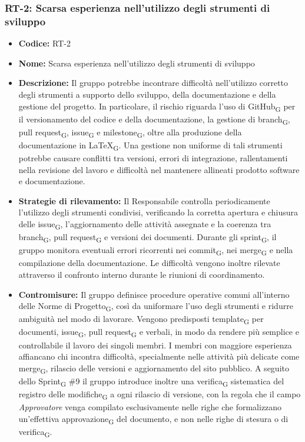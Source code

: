 ﻿\documentclass[a4paper, 10pt, colorlinks=true, linkcolor=black, urlcolor=blue, citecolor=blue, hidelinks]{article}
\begin{document}
\subsubsection{RT-2: Scarsa esperienza nell'utilizzo degli strumenti di sviluppo}

\begin{itemize}
    \item \textbf{Codice:} RT-2

    \item \textbf{Nome:} Scarsa esperienza nell'utilizzo degli strumenti di sviluppo

    \item \textbf{Descrizione:} Il gruppo potrebbe incontrare difficoltà nell'utilizzo corretto degli strumenti a supporto dello sviluppo, della documentazione e della gestione del progetto. In particolare, il rischio riguarda l'uso di GitHub\textsubscript{G} per il versionamento del codice e della documentazione, la gestione di branch\textsubscript{G}, pull request\textsubscript{G}, issue\textsubscript{G} e milestone\textsubscript{G}, oltre alla produzione della documentazione in LaTeX\textsubscript{G}. Una gestione non uniforme di tali strumenti potrebbe causare conflitti tra versioni, errori di integrazione, rallentamenti nella revisione del lavoro e difficoltà nel mantenere allineati prodotto software e documentazione.

    \item \textbf{Strategie di rilevamento:} Il Responsabile controlla periodicamente l'utilizzo degli strumenti condivisi, verificando la corretta apertura e chiusura delle issue\textsubscript{G}, l'aggiornamento delle attività assegnate e la coerenza tra branch\textsubscript{G}, pull request\textsubscript{G} e versioni dei documenti. Durante gli sprint\textsubscript{G}, il gruppo monitora eventuali errori ricorrenti nei commit\textsubscript{G}, nei merge\textsubscript{G} e nella compilazione della documentazione. Le difficoltà vengono inoltre rilevate attraverso il confronto interno durante le riunioni di coordinamento.

    \item \textbf{Contromisure:} Il gruppo definisce procedure operative comuni all'interno delle Norme di Progetto\textsubscript{G}, così da uniformare l'uso degli strumenti e ridurre ambiguità nel modo di lavorare. Vengono predisposti template\textsubscript{G} per documenti, issue\textsubscript{G}, pull request\textsubscript{G} e verbali, in modo da rendere più semplice e controllabile il lavoro dei singoli membri. I membri con maggiore esperienza affiancano chi incontra difficoltà, specialmente nelle attività più delicate come merge\textsubscript{G}, rilascio delle versioni e aggiornamento del sito pubblico. A seguito dello Sprint\textsubscript{G} \#9 il gruppo introduce inoltre una verifica\textsubscript{G} sistematica del registro delle modifiche\textsubscript{G} a ogni rilascio di versione, con la regola che il campo \textit{Approvatore} venga compilato esclusivamente nelle righe che formalizzano un'effettiva approvazione\textsubscript{G} del documento, e non nelle righe di stesura o di verifica\textsubscript{G}.


\end{itemize}
\end{document}
